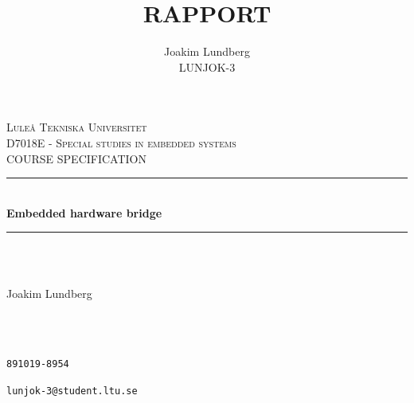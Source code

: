 \documentclass[12pt,a4paper,english,titlepage,oneside]{article}
\title{RAPPORT}
\author{Joakim Lundberg\\ LUNJOK-3 }
\begin{document}
\begin{titlepage}

\newcommand{\HRule}{\rule{\linewidth}{0.5mm}} %

\center %
 

\textsc{\huge Luleå Tekniska Universitet}\\[1cm] %
\textsc{\large D7018E - Special studies in embedded systems}\\[0.3cm] %
\textsc{\large COURSE SPECIFICATION}\\[0.4cm] %


\HRule \\[0.6cm]
{ \huge \bfseries Embedded hardware bridge}\\[0.25cm] %
\HRule \\[2.5cm]



\begin{minipage}{0.3\textwidth}
\begin{flushleft} \large
\emph{}\\
Joakim Lundberg \\
\end{flushleft}
\end{minipage}
~
\begin{minipage}{0.38\textwidth}
\begin{flushleft} \large
\emph{} \\
\texttt{891019-8954}
\end{flushleft}
\texttt{lunjok-3@student.ltu.se}
\end{minipage}\\[8.0cm]



\end{titlepage}
\end{document}
